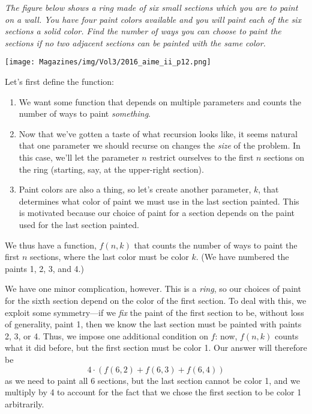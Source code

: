 \documentclass{article}
\begin{document}
\begin{multicols}{3}
\textit{The figure below shows a ring made of six small sections which you are to paint on a wall. You have four paint colors available and you will paint each of the six sections a solid color. Find the number of ways you can choose to paint the sections if no two adjacent sections can be painted with the same color.}
\begin{center}
\texttt{[image: Magazines/img/Vol3/2016\_aime\_ii\_p12.png]}
\end{center}

Let's first define the function:
\begin{enumerate}
    \item We want some function that depends on multiple parameters and counts the number of ways to paint \textit{something}.
    \item Now that we've gotten a taste of what recursion looks like, it seems natural that one parameter we should recurse on changes the \textit{size} of the problem. In this case, we'll let the parameter $n$ restrict ourselves to the first $n$ sections on the ring (starting, say, at the upper-right section).
    \item Paint colors are also a thing, so let's create another parameter, $k$, that determines what color of paint we must use in the last section painted. This is motivated because our choice of paint for a section depends on the paint used for the last section painted.
\end{enumerate}
We thus have a function, $f(n, k)$ that counts the number of ways to paint the first $n$ sections, where the last color must be color $k$. (We have numbered the paints 1, 2, 3, and 4.)

We have one minor complication, however. This is a \textit{ring}, so our choices of paint for the sixth section depend on the color of the first section. To deal with this, we exploit some symmetry—if we \textit{fix} the paint of the first section to be, without loss of generality, paint 1, then we know the last section must be painted with paints 2, 3, or 4. Thus, we impose one additional condition on $f$: now, $f(n, k)$ counts what it did before, but the first section must be color 1. Our answer will therefore be
$$4 \cdot (f(6, 2) + f(6, 3) + f(6, 4))$$
as we need to paint all 6 sections, but the last section cannot be color 1, and we multiply by 4 to account for the fact that we chose the first section to be color 1 arbitrarily.


\end{multicols}
\end{document}
